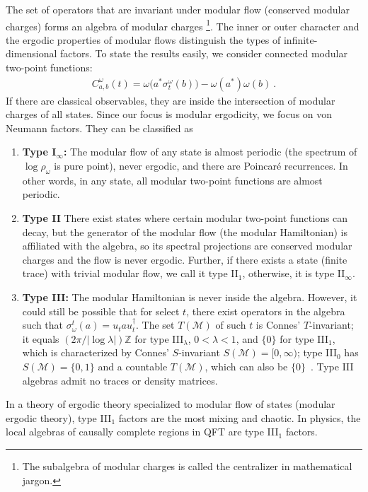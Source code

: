 \documentclass[a4paper,11pt]{article}
\theoremstyle{definition}
\begin{document}
The set of operators that are invariant under modular flow (conserved modular charges) forms an algebra of modular charges \footnote{The subalgebra of modular charges is called {the centralizer} in mathematical jargon.}. The inner or outer character and the ergodic properties of modular flows distinguish the types of infinite-dimensional factors. To state the results easily, we consider connected modular two-point functions:
\begin{align}
    C^{\omega}_{a,b}(t)=\omega\bigl(a^*\sigma^\omega_t(b)\bigr)-\omega(a^*)\omega(b)\ .
\end{align}
If there are classical observables, they are inside the intersection of modular charges of all states. Since our focus is modular ergodicity, we focus on von Neumann factors. They can be classified as
\begin{enumerate}
    \item {\bf Type I$_\infty$:} The modular flow of any state is almost periodic (the spectrum of $\log\rho_\omega$ is pure point), never ergodic, and there are Poincaré recurrences. In other words, in any state, all modular two-point functions are almost periodic.
    \item {\bf Type II} There exist states where certain modular two-point functions can decay, but the generator of the modular flow (the modular Hamiltonian) is affiliated with the algebra, so its spectral projections are conserved modular charges and the flow is never ergodic. Further, if there exists a state (finite trace) with trivial modular flow, we call it type II$_1$, otherwise, it is type II$_\infty$.
    \item {\bf Type III:} The modular Hamiltonian is never inside the algebra. However, it could still be possible that for select $t$, there exist operators in the algebra such that $\sigma_\omega^t(a)=u_t a u_t^\dagger$. The set $T(\mathcal M)$ of such $t$ is Connes' $T$-invariant; it equals $(2\pi/|\log\lambda|)\mathbb Z$ for type III$_\lambda$, $0<\lambda<1$, and $\{0\}$ for type III$_1$, which is characterized by Connes' $S$-invariant $S(\mathcal M)=[0,\infty)$; type III$_0$ has $S(\mathcal M)=\{0,1\}$ and a countable $T(\mathcal M)$, which can also be $\{0\}$~\cite{Connes1973}. Type III algebras admit no traces or density matrices.
\end{enumerate}
In a theory of ergodic theory specialized to modular flow of states (modular ergodic theory), type III$_1$ factors are the most mixing and chaotic. In physics, the local algebras of causally complete regions in QFT are type III$_1$ factors.
\end{document}
